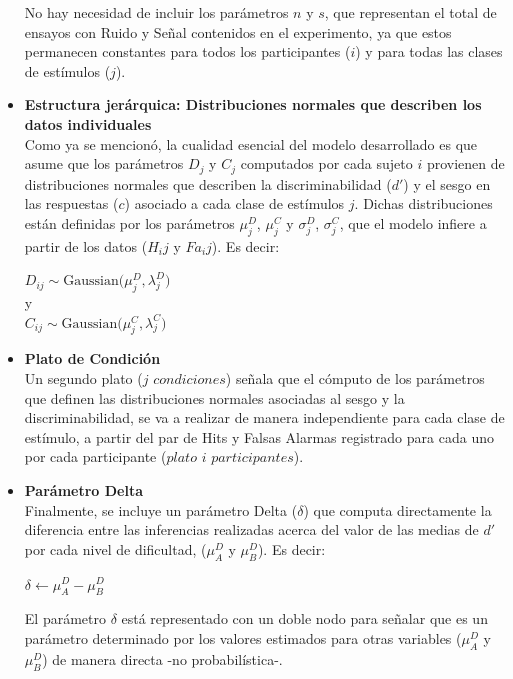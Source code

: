\begin{itemize}
No hay necesidad de incluir los parámetros $n$ y $s$, que representan el total de ensayos con Ruido y Señal contenidos en el experimento, ya que estos permanecen constantes para todos los participantes ($i$) y para todas las clases de estímulos ($j$).\\

\item \textbf{Estructura jerárquica: Distribuciones normales que describen los datos individuales}\\

Como ya se mencionó, la cualidad esencial del modelo desarrollado es que asume que los parámetros $D_{j}$ y $C_{j}$ computados por cada sujeto $i$ provienen de distribuciones normales que describen la discriminabilidad ($d'$) y el sesgo en las respuestas ($c$) asociado a cada clase de estímulos $j$. Dichas distribuciones están definidas por los parámetros $\mu^D_{j}$, $\mu^C_{j}$ y $\sigma^D_{j}$, $\sigma^C_{j}$, que el modelo infiere a partir de los datos ($H_ij$ y $Fa_ij$). Es decir:\\

\begin{center}
$D_{ij}\sim \mathrm{Gaussian}\bigl(\mu^D_{j},\lambda^D_{j})$\\
y\\
$C_{ij}\sim \mathrm{Gaussian}\bigl(\mu^C_{j},\lambda^C_{j})$\\
\end{center}

\item \textbf{Plato de Condición}\\

Un segundo plato ($j$ $condiciones$) señala que el cómputo de los parámetros que definen las distribuciones normales asociadas al sesgo y la discriminabilidad, se va a realizar de manera independiente para cada clase de estímulo, a partir del par de Hits y Falsas Alarmas registrado para cada uno por cada participante ($plato$ $i$ $participantes$).\\

\item \textbf{Parámetro Delta}\\

Finalmente, se incluye un parámetro Delta ($\delta$) que computa directamente la diferencia entre las inferencias realizadas acerca del valor de las medias de $d'$ por cada nivel de dificultad, ($\mu^D_{A}$ y $\mu^D_{B}$). Es decir:\\

\begin{center}
$\delta \gets \mu^D_{A}-\mu^D_{B}$\\
\end{center}

El parámetro $\delta$ está representado con un doble nodo para señalar que es un parámetro determinado por los valores estimados para otras variables ($\mu^D_{A}$ y $\mu^D_{B}$) de manera directa -no probabilística-.\\
\end{itemize} 



